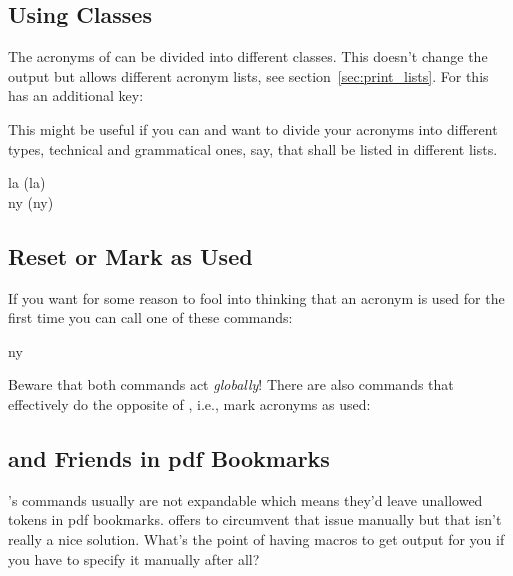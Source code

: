 \documentclass[DIV10,toc=index,toc=bib,hyperfootnotes=false]{cnpkgdoc}
\makeatletter
\providecommand*\sinceversion[1]{%
  \@bsphack
  \marginnote{%
    \footnotesize\sffamily\RaggedRight
    \textcolor{black!75}{Introduced in version~#1}}%
  \@esphack}
\makeatother
\begin{document}
\subsection{Using Classes}
The acronyms of \acro can be divided into different classes. This doesn't change
the output but allows different acronym lists, see section~\ref{sec:print_lists}.
For this  has an additional key:
\begin{beschreibung}
\end{beschreibung}

This might be useful if you can and want to divide your acronyms into different
types, technical and grammatical ones, say, that shall be listed in different
lists.

\begin{beispiel}
 \acl{la} (\acs{la}) \\
 \acl{ny} (\acs{ny})
\end{beispiel}

\subsection{Reset or Mark as Used}
If you want for some reason to fool \acro into thinking that an acronym is used
for the first time you can call one of these commands:
\begin{beschreibung}
 \sinceversion{0.5}
\end{beschreibung}
\begin{beispiel}
 \ac{ny}
\end{beispiel}
Beware that both commands act \emph{globally}! There are also commands that
effectively do the opposite of , i.e., mark acronyms as used:
\begin{beschreibung}
 \sinceversion{0.5}
 \sinceversion{0.6a}
\end{beschreibung}

\subsection{ and Friends in \acs*{pdf} Bookmarks}
\noindent\sinceversion{0.5}\acro's commands usually are not expandable which
means they'd leave unallowed tokens in \acs{pdf} bookmarks. 
offers  to circumvent that issue manually but that isn't
really a nice solution. What's the point of having macros to get output for you
if you have to specify it manually after all?
\end{document}
